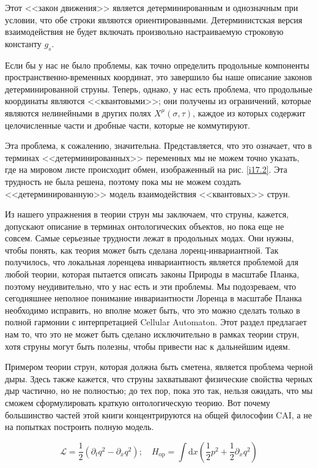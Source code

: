 \documentclass[main.tex]{subfiles}
\begin{document}
Этот <<закон движения>> является детерминированным и однозначным при условии, что обе строки являются ориентированными. Детерминистская версия взаимодействия не будет включать произвольно настраиваемую строковую константу $g_s$.

Если бы у нас не было проблемы, как точно определить продольные компоненты пространственно-временных координат, это завершило бы наше описание законов детерминированной струны. Теперь, однако, у нас есть проблема, что продольные координаты являются <<квантовыми>>; они получены из ограничений, которые являются нелинейными в других полях $X^\mu(\sigma,\tau)$, каждое из которых содержит целочисленные части и дробные части, которые не коммутируют. 

Эта проблема, к сожалению, значительна. Представляется, что это означает, что в терминах <<детерминированных>> переменных мы не можем точно указать, где на мировом листе происходит обмен, изображенный на рис. \ref{i17.2}. Эта трудность не была решена, поэтому пока мы не можем создать <<детерминированную>> модель взаимодействия <<квантовых>> струн.

Из нашего упражнения в теории струн мы заключаем, что струны, кажется, допускают описание в терминах онтологических объектов, но пока еще не совсем. Самые серьезные трудности лежат в продольных модах. Они нужны, чтобы понять, как теория может быть сделана лоренц-инвариантной. Так получилось, что локальная лоренцева инвариантность является проблемой для любой теории, которая пытается описать законы Природы в масштабе Планка, поэтому неудивительно, что у нас есть и эти проблемы. Мы подозреваем, что сегодняшнее неполное понимание инвариантности Лоренца в масштабе Планка необходимо исправить, но вполне может быть, что это можно сделать только в полной гармонии с интерпретацией Cellular Automaton. Этот раздел предлагает нам то, что это не может быть сделано исключительно в рамках теории струн, хотя струны могут быть полезны, чтобы привести нас к дальнейшим идеям.

Примером теории струн, которая должна быть сметена, является проблема черной дыры. Здесь также кажется, что струны захватывают физические свойства черных дыр частично, но не полностью; до тех пор, пока это так, нельзя ожидать, что мы сможем сформулировать краткую онтологическую теорию. Вот почему большинство частей этой книги концентрируются на общей философии CAI, а не на попытках построить полную модель.




\begin{equation}\label{17.2}
	\mathcal{L}=\frac{1}{2}\left(\partial_{t} q^{2}-\partial_{x} q^{2}\right) ; \quad H_{\mathrm{op}}=\int \mathrm{d} x\left(\frac{1}{2} p^{2}+\frac{1}{2} \partial_{x} q^{2}\right)
\end{equation}
\end{document}
